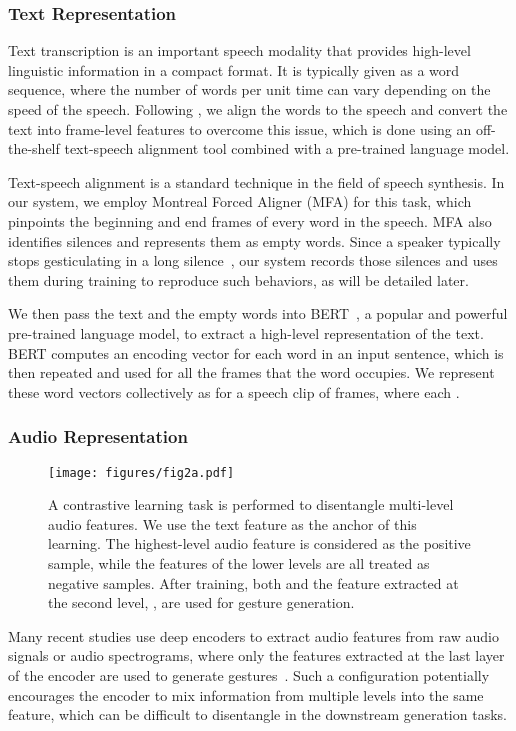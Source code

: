 \documentclass[acmtog,authorversion]{acmart}
\begin{document}
\subsubsection{Text Representation}
Text transcription is an important speech modality that provides high-level linguistic information in a compact format. It is typically given as a word sequence, where the number of words per unit time can vary depending on the speed of the speech. Following \cite{kucherenko2020gesticulator}, we align the words to the speech and convert the text into frame-level features to overcome this issue, which is done using an off-the-shelf text-speech alignment tool combined with a pre-trained language model.

Text-speech alignment is a standard technique in the field of speech synthesis. In our system, we employ Montreal Forced Aligner (MFA) \cite{mcauliffe2017montreal} for this task, which pinpoints the beginning and end frames of every word in the speech. MFA also identifies silences and represents them as empty words. Since a speaker typically stops gesticulating in a long silence~\cite{graziano2018silence}, our system records those silences and uses them during training to reproduce such behaviors, as will be detailed later.

We then pass the text and the empty words into BERT~\cite{devlin2019bert}, a popular and powerful pre-trained language model, to extract a high-level representation of the text. BERT computes an encoding vector for each word in an input sentence, which is then repeated and used for all the frames that the word occupies. We represent these word vectors collectively as  for a speech clip of  frames, where each .

\subsubsection{Audio Representation}
\label{subsubsec:audio_representation}
\begin{figure}[t]
    \centering
    \texttt{[image: figures/fig2a.pdf]}
    \caption{A contrastive learning task is performed to disentangle multi-level audio features. We use the text feature  as the anchor of this learning. The highest-level audio feature  is considered as the positive sample, while the features of the lower levels are all treated as negative samples. After training, both  and the feature extracted at the second level, , are used for gesture generation.}
    \Description{}
    \label{fig:audio_feature_extraction}
\end{figure}
Many recent studies use deep encoders to extract audio features from raw audio signals or audio spectrograms, where only the features extracted at the last layer of the encoder are used to generate gestures~\cite{yoon2020speech,alexanderson2020style,kucherenko2020gesticulator,qian2021speech,li2021audio2gestures}. Such a configuration potentially encourages the encoder to mix information from multiple levels into the same feature, which can be difficult to disentangle in the downstream generation tasks.
\end{document}
